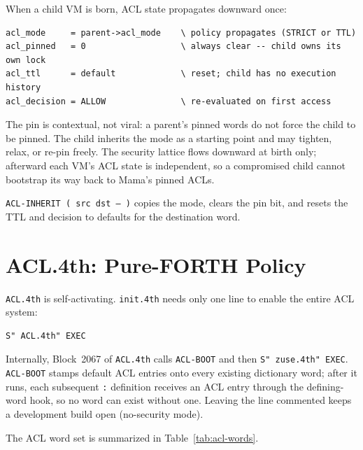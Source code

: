 When a child VM is born, ACL state propagates downward once:

\begin{lstlisting}[language=Forth]
acl_mode     = parent->acl_mode    \ policy propagates (STRICT or TTL)
acl_pinned   = 0                   \ always clear -- child owns its own lock
acl_ttl      = default             \ reset; child has no execution history
acl_decision = ALLOW               \ re-evaluated on first access
\end{lstlisting}

The pin is contextual, not viral: a parent's pinned words do not force the
child to be pinned. The child inherits the mode as a starting point and may
tighten, relax, or re-pin freely. The security lattice flows downward at
birth only; afterward each VM's ACL state is independent, so a compromised
child cannot bootstrap its way back to Mama's pinned ACLs.

\texttt{ACL-INHERIT ( src dst -- )} copies the mode, clears the pin bit,
and resets the TTL and decision to defaults for the destination word.

\section{ACL.4th: Pure-FORTH Policy}
\label{vol2:sec:acl:forth}


\texttt{ACL.4th} is self-activating. \texttt{init.4th} needs only one line
to enable the entire ACL system:

\begin{lstlisting}[language=Forth]
S" ACL.4th" EXEC
\end{lstlisting}

Internally, Block~2067 of \texttt{ACL.4th} calls \texttt{ACL-BOOT} and then
\texttt{S" zuse.4th" EXEC}. \texttt{ACL-BOOT} stamps default ACL entries onto
every existing dictionary word; after it runs, each subsequent \texttt{:}
definition receives an ACL entry through the defining-word hook, so no word can
exist without one. Leaving the line commented keeps a development build open
(no-security mode).

The ACL word set is summarized in Table~\ref{tab:acl-words}.

